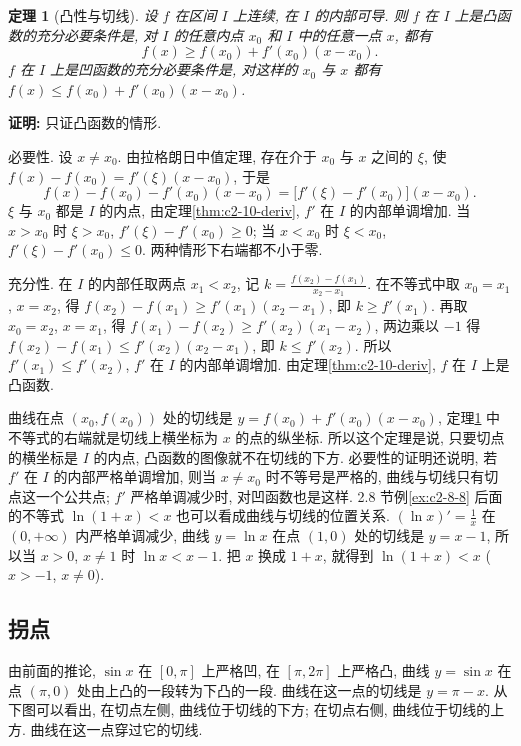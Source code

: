 \documentclass[UTF8,openany]{ctexbook}
\theoremstyle{chinesetextbook}
\newtheorem{theorem}{定理}[section]
\newenvironment{cnproof}{\par\indent\textbf{证明:} \ignorespaces}{\par}
\begin{document}
\begin{theorem}[凸性与切线]\label{thm:c2-10-tangent}
设 $f$ 在区间 $I$ 上连续, 在 $I$ 的内部可导. 则 $f$ 在 $I$ 上是凸函数的充分必要条件是, 对 $I$ 的任意内点 $x_0$ 和 $I$ 中的任意一点 $x$, 都有
\[
f(x)\ge f(x_0)+f'(x_0)(x-x_0).
\]
$f$ 在 $I$ 上是凹函数的充分必要条件是, 对这样的 $x_0$ 与 $x$ 都有 $f(x)\le f(x_0)+f'(x_0)(x-x_0)$.
\end{theorem}
\begin{cnproof}
只证凸函数的情形.

必要性. 设 $x\ne x_0$. 由拉格朗日中值定理, 存在介于 $x_0$ 与 $x$ 之间的 $\xi$, 使 $f(x)-f(x_0)=f'(\xi)(x-x_0)$, 于是
\[
f(x)-f(x_0)-f'(x_0)(x-x_0)=\bigl[f'(\xi)-f'(x_0)\bigr](x-x_0).
\]
$\xi$ 与 $x_0$ 都是 $I$ 的内点, 由定理\ref{thm:c2-10-deriv}, $f'$ 在 $I$ 的内部单调增加. 当 $x>x_0$ 时 $\xi>x_0$, $f'(\xi)-f'(x_0)\ge0$; 当 $x<x_0$ 时 $\xi<x_0$, $f'(\xi)-f'(x_0)\le0$. 两种情形下右端都不小于零.

充分性. 在 $I$ 的内部任取两点 $x_1<x_2$, 记 $\displaystyle k=\frac{f(x_2)-f(x_1)}{x_2-x_1}$. 在不等式中取 $x_0=x_1$, $x=x_2$, 得 $f(x_2)-f(x_1)\ge f'(x_1)(x_2-x_1)$, 即 $k\ge f'(x_1)$. 再取 $x_0=x_2$, $x=x_1$, 得 $f(x_1)-f(x_2)\ge f'(x_2)(x_1-x_2)$, 两边乘以 $-1$ 得 $f(x_2)-f(x_1)\le f'(x_2)(x_2-x_1)$, 即 $k\le f'(x_2)$. 所以 $f'(x_1)\le f'(x_2)$, $f'$ 在 $I$ 的内部单调增加. 由定理\ref{thm:c2-10-deriv}, $f$ 在 $I$ 上是凸函数.
\end{cnproof}
曲线在点 $(x_0,f(x_0))$ 处的切线是 $y=f(x_0)+f'(x_0)(x-x_0)$, 定理\ref{thm:c2-10-tangent} 中不等式的右端就是切线上横坐标为 $x$ 的点的纵坐标. 所以这个定理是说, 只要切点的横坐标是 $I$ 的内点, 凸函数的图像就不在切线的下方. 必要性的证明还说明, 若 $f'$ 在 $I$ 的内部严格单调增加, 则当 $x\ne x_0$ 时不等号是严格的, 曲线与切线只有切点这一个公共点; $f'$ 严格单调减少时, 对凹函数也是这样. 2.8 节例\ref{ex:c2-8-8} 后面的不等式 $\ln(1+x)<x$ 也可以看成曲线与切线的位置关系. $\displaystyle(\ln x)'=\frac1x$ 在 $(0,+\infty)$ 内严格单调减少, 曲线 $y=\ln x$ 在点 $(1,0)$ 处的切线是 $y=x-1$, 所以当 $x>0$, $x\ne1$ 时 $\ln x<x-1$. 把 $x$ 换成 $1+x$, 就得到 $\ln(1+x)<x$ ($x>-1$, $x\ne0$).
\subsection{拐点}
由前面的推论, $\sin x$ 在 $[0,\pi]$ 上严格凹, 在 $[\pi,2\pi]$ 上严格凸, 曲线 $y=\sin x$ 在点 $(\pi,0)$ 处由上凸的一段转为下凸的一段. 曲线在这一点的切线是 $y=\pi-x$. 从下图可以看出, 在切点左侧, 曲线位于切线的下方; 在切点右侧, 曲线位于切线的上方. 曲线在这一点穿过它的切线.
\begin{center}
\end{center}
\end{document}
